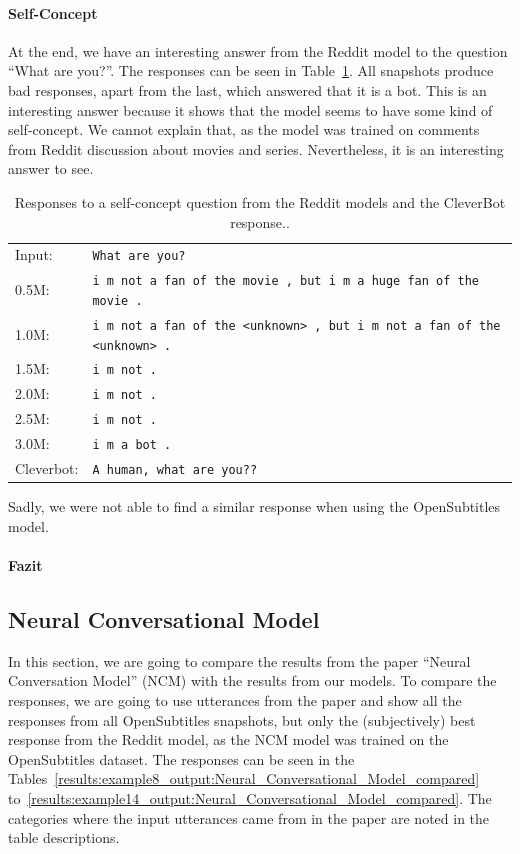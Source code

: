 \paragraph{Self-Concept} At the end, we have an interesting answer from the Reddit model to the question ``What are you?''. The responses can be seen in Table~\ref{results:example7_output:Reddit_compared}. All snapshots produce bad responses, apart from the last, which answered that it is a bot. This is an interesting answer because it shows that the model seems to have some kind of self-concept. We cannot explain that, as the model was trained on comments from Reddit discussion about movies and series. Nevertheless, it is an interesting answer to see.

\begin{table}[H]
	\centering
	\begin{adjustbox}{max width=\textwidth}
		\begin{tabular}{ll}
			\toprule
			Input: 	& \texttt{What are you?}\\
			0.5M: 	& \texttt{i m not a fan of the movie , but i m a huge fan of the movie .}\\
			1.0M: 	& \texttt{i m not a fan of the <unknown> , but i m not a fan of the <unknown> .}\\
			1.5M:	& \texttt{i m not .}\\
			2.0M:	& \texttt{i m not .}\\
			2.5M:	& \texttt{i m not .}\\
			3.0M:	& \texttt{i m a bot .}\\
			Cleverbot:	& \texttt{A human, what are you??}\\
			\bottomrule
		\end{tabular}
	\end{adjustbox}
	\caption{Responses to a self-concept question from the Reddit models and the CleverBot response..}
	\label{results:example7_output:Reddit_compared}
\end{table}

Sadly, we were not able to find a similar response when using the OpenSubtitles model.

\paragraph{Fazit}

\subsection{Neural Conversational Model}
\label{results:comparison:ncm}
In this section, we are going to compare the results from the paper ``Neural Conversation Model'' (NCM) with the results from our models. To compare the responses, we are going to use utterances from the paper and show all the responses from all OpenSubtitles snapshots, but only the (subjectively) best response from the Reddit model, as the NCM model was trained on the OpenSubtitles dataset. The responses can be seen in the Tables~\ref{results:example8_output:Neural_Conversational_Model_compared} to~\ref{results:example14_output:Neural_Conversational_Model_compared}. The categories where the input utterances came from in the paper are noted in the table descriptions.

